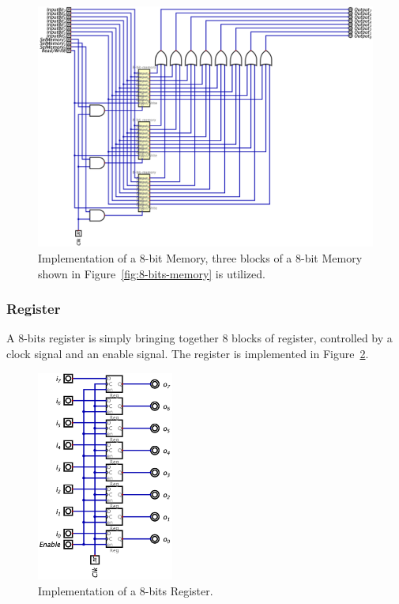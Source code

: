 \documentclass[conference]{IEEEtran}
\begin{document}
\begin{figure}[h!]
    \centering
    \includegraphics[width=\textwidth]{assets/8-bit-memories.png}
    \caption{Implementation of a 8-bit Memory, three blocks of a 8-bit Memory shown in Figure~\ref{fig:8-bits-memory} is utilized.}
    \label{fig:8-bits-memories}
\end{figure}

\subsubsection{Register}

A 8-bits register is simply bringing together 8 blocks of register, controlled by a clock signal and an enable signal. The register is implemented in Figure~\ref{fig:8-bits-register}.
\begin{figure}[h!]
    \centering
    \includegraphics[width=0.4\textwidth]{assets/8-bit-register.png}
    \caption{Implementation of a 8-bits Register.}
    \label{fig:8-bits-register}
\end{figure}
\end{document}
